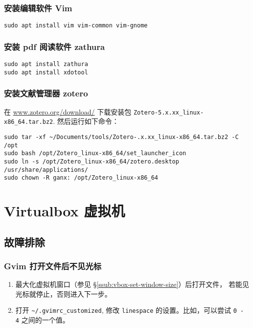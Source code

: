 \documentclass[
    11pt,
    cite=authoryear,
    device=phone,
    lang=cn,
    mode=simple,
    result=answer,
    toc=onecol,
]{elegantbook_sierxue}
\begin{document}
\subsubsection{安装编辑软件 Vim}%
\label{ssub:vm-apt-vim}

\begin{lstlisting}[escapeinside=``]
sudo apt install vim vim-common vim-gnome
\end{lstlisting}

\subsubsection{安装 pdf 阅读软件 zathura}%
\label{ssub:vm-zathura}

\begin{lstlisting}[escapeinside=``]
sudo apt install zathura
sudo apt install xdotool
\end{lstlisting}

\subsubsection{安装文献管理器 zotero}%
\label{ssub:vm-zotero}

在 \href{https://www.zotero.org/download/}{www.zotero.org/download/}
下载安装包 \lstinline{Zotero-5.x.xx_linux-x86_64.tar.bz2}.
然后运行如下命令：
\begin{lstlisting}[escapeinside=``]
sudo tar -xf ~/Documents/tools/Zotero-.x.xx_linux-x86_64.tar.bz2 -C /opt
sudo bash /opt/Zotero_linux-x86_64/set_launcher_icon
sudo ln -s /opt/Zotero_linux-x86_64/zotero.desktop /usr/share/applications/
sudo chown -R ganx: /opt/Zotero_linux-x86_64
\end{lstlisting}

\section{Virtualbox 虚拟机}%
\label{sec:vbox-a}

\subsection{故障排除}%
\label{sub:vim-troubleshooting}

\subsubsection{Gvim 打开文件后不见光标}%
\label{ssub:vim-ts-cursor}

\begin{enumerate}
    \item 最大化虚拟机窗口（参见
        \S\ref{ssub:vbox-set-window-size}）后打开文件，
        若能见光标就停止，否则进入下一步。
    \item 打开 \lstinline{~/.gvimrc_customized}, 修改
        \lstinline{linespace} 的设置。比如，可以尝试  \lstinline{0 - 4}
        之间的一个值。
\end{enumerate}
\end{document}
